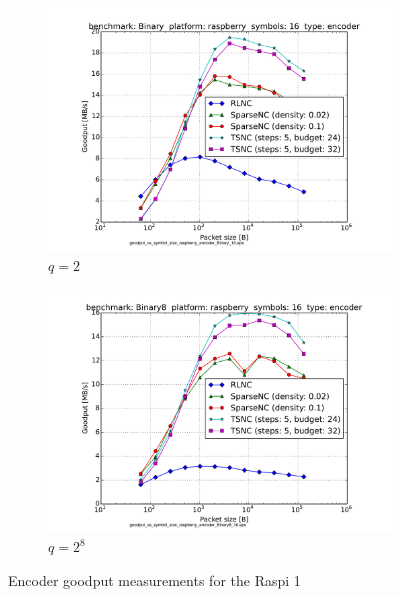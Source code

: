\begin{figure}
\begin{subfigure}[b]{0.475\textwidth}
        \centering 
        \includegraphics[width=1.2\textwidth]{images/rasp1_good_vs_B_enc_gf2.pdf}
        \caption[]%
        {{\small $q = 2$}}    
        \label{fig:mean and std of net34}
    \end{subfigure}
    \quad
    \begin{subfigure}[b]{0.475\textwidth}   
        \centering 
        \includegraphics[width=1.2\textwidth]{images/rasp1_good_vs_B_enc_gf256.pdf}
        \caption[]%
        {{\small $q = 2^8$}}    
        \label{fig:mean and std of net44}
    \end{subfigure}
    \caption[ The average and standard deviation of critical parameters ]
    {\small Encoder goodput measurements for the \ac{Raspi} 1} 
    \label{fig:mean and std of nets}
\end{figure}

